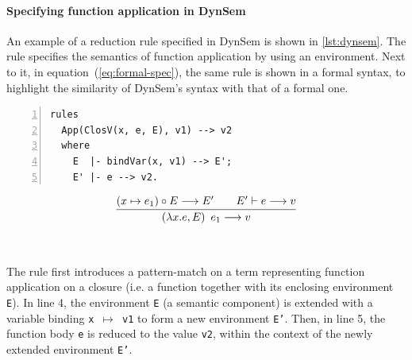 \paragraph{Specifying function application in DynSem} An example of a reduction
rule specified in DynSem is shown in \cref{lst:dynsem}. The rule specifies the
semantics of function application by using an environment. Next to it, in
equation~(\ref{eq:formal-spec}), the same rule is shown in a formal syntax, to
highlight the similarity of DynSem's syntax with that of a formal one.

\begin{minipage}[t]{\linewidth}
\begin{minipage}{0.45\textwidth}
\begin{lstlisting}[language=dynsem,numbers=left]
rules
  App(ClosV(x, e, E), v1) --> v2
  where
    E  |- bindVar(x, v1) --> E';
    E' |- e --> v2.
\end{lstlisting}
\end{minipage}
\begin{minipage}{0.55\textwidth}
  \centering
  \begin{equation*}
    \infer{%
      \left(\lambda x.e, E\right)~e_1 \longrightarrow v%
    }{%
      (x \mapsto e_1) \circ E \longrightarrow E' &\quad E' \vdash e \longrightarrow v
    }
  \end{equation*}
\end{minipage}
\\
\begin{minipage}[t]{0.47\textwidth}
  \label{lst:dynsem}
\end{minipage}
\hspace{0.02\textwidth}
\begin{minipage}[t]{0.5\textwidth}
  \renewcommand*\figurename{Equation}
  \makeatletter
    \let\c@figure\c@equation
  \makeatother
  \label{eq:formal-spec}
\end{minipage}
\end{minipage}

The rule first introduces a pattern-match on a term representing function
application on a closure (i.e. a function together with its enclosing
environment \texttt{E}). In line 4, the environment \texttt{E} (a semantic
component) is extended with a variable binding \texttt{x $\mapsto$ v1} to form a
new environment \texttt{E'}. Then, in line 5, the function body \texttt{e} is
reduced to the value \texttt{v2}, within the context of the newly extended
environment \texttt{E'}.

